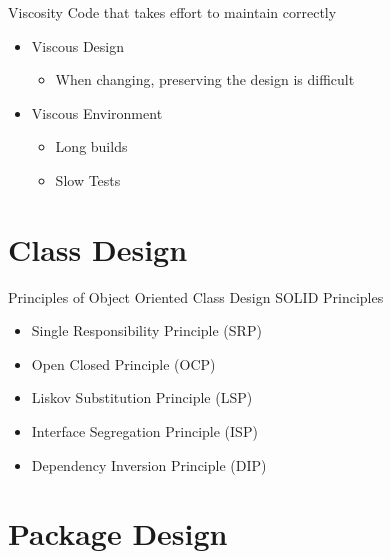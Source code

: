 \documentclass[xcolor=svgnames]{beamer}
\begin{document}

{%
%
\begin{frame}{Viscosity}
    Code that takes effort to maintain correctly

    \begin{itemize}
        \item<2->Viscous Design
        \begin{itemize}
            \item<4->When changing, preserving the design is difficult
        \end{itemize}
        \item<3->Viscous Environment
        \begin{itemize}
            \item<5->Long builds
            \item<6->Slow Tests
        \end{itemize}
    \end{itemize}
\end{frame}
}


\section{Class Design}


\begin{frame}{Principles of Object Oriented Class Design}
    SOLID Principles
    \begin{itemize}
        \item Single Responsibility Principle (SRP)
        \item Open Closed Principle (OCP)
        \item Liskov Substitution Principle (LSP)
        \item Interface Segregation Principle (ISP)
        \item Dependency Inversion Principle (DIP)
    \end{itemize}
\end{frame}


\section{Package Design}
\end{document}
